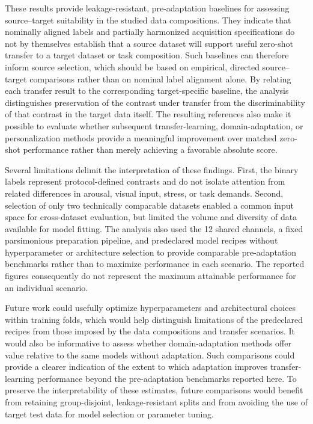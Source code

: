 \documentclass[10pt,letterpaper]{article}
\begin{document}
\medskip

These results provide leakage-resistant, pre-adaptation baselines for assessing
source--target suitability in the studied data compositions. They indicate that
nominally aligned labels and partially harmonized acquisition specifications do
not by themselves establish that a source dataset will support useful zero-shot
transfer to a target dataset or task composition. Such baselines can therefore
inform source selection, which should be based on empirical, directed
source--target comparisons rather than on nominal label alignment alone. By
relating each transfer result to the corresponding target-specific baseline,
the analysis distinguishes preservation of the contrast under transfer from
the discriminability of that contrast in the target data itself. The resulting
references also make it possible to evaluate whether subsequent
transfer-learning, domain-adaptation, or personalization methods provide a
meaningful improvement over matched zero-shot performance rather than merely
achieving a favorable absolute score.

\medskip

Several limitations delimit the interpretation of these findings. First, the
binary labels represent protocol-defined contrasts and do not isolate attention
from related differences in arousal, visual input, stress, or task demands.
Second, selection of only two technically comparable datasets enabled a common
input space for cross-dataset evaluation, but limited the volume and diversity
of data available for model fitting. The analysis also used the 12 shared
channels, a fixed parsimonious preparation pipeline, and predeclared model
recipes without hyperparameter or architecture selection to provide comparable
pre-adaptation benchmarks rather than to maximize performance in each
scenario. The reported figures consequently do not represent the maximum
attainable performance for an individual scenario.

\medskip

Future work could usefully optimize hyperparameters and architectural choices
within training folds, which would help distinguish limitations of the
predeclared recipes from those imposed by the data compositions and transfer
scenarios. It would also be informative to assess whether domain-adaptation
methods offer value relative to the same models without adaptation. Such
comparisons could provide a clearer indication of the extent to which
adaptation improves transfer-learning performance beyond the pre-adaptation
benchmarks reported here. To preserve the interpretability of these estimates,
future comparisons would benefit from retaining group-disjoint,
leakage-resistant splits and from avoiding the use of target test data for
model selection or parameter tuning.
\end{document}
